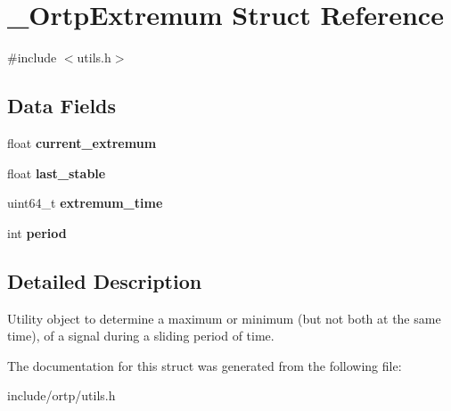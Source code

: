 \section{\+\_\+\+Ortp\+Extremum Struct Reference}
\label{struct__OrtpExtremum}


{\ttfamily \#include $<$utils.\+h$>$}

\subsection*{Data Fields}
\begin{DoxyCompactItemize}
\item 
\mbox{\label{struct__OrtpExtremum_acd0b2055e410f53632c7ac869bb5bae5}} 
float {\bfseries current\+\_\+extremum}
\item 
\mbox{\label{struct__OrtpExtremum_a888d187083970a245c60c9d34fcebdd5}} 
float {\bfseries last\+\_\+stable}
\item 
\mbox{\label{struct__OrtpExtremum_ad5dd15194f231c7303980b89a7b66f69}} 
uint64\+\_\+t {\bfseries extremum\+\_\+time}
\item 
\mbox{\label{struct__OrtpExtremum_a5b45b8d130a8622af93e98a9ac426d66}} 
int {\bfseries period}
\end{DoxyCompactItemize}


\subsection{Detailed Description}
Utility object to determine a maximum or minimum (but not both at the same time), of a signal during a sliding period of time. 

The documentation for this struct was generated from the following file\+:\begin{DoxyCompactItemize}
\item 
include/ortp/utils.\+h\end{DoxyCompactItemize}
